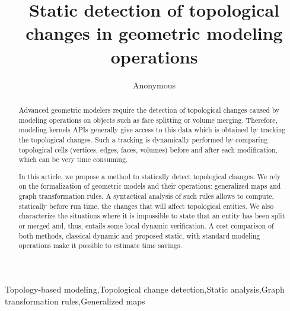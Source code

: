 \documentclass[times,twocolumn,final]{els-format/elsarticle}
\begin{document}

\begin{frontmatter}

\title{Static detection of topological changes in geometric modeling operations}%

\author{Anonymous}





\received{\today}

\begin{abstract}
  Advanced geometric modelers require the detection of topological changes
  caused by modeling operations on objects such as face splitting or volume
  merging. Therefore, modeling kernels APIs generally give access to this data
  which is obtained by tracking the topological changes. Such a tracking is
  dynamically performed by comparing topological cells (vertices, edges, faces,
  volumes) before and after each modification, which can be very time consuming.

  In this article, we propose a method to statically detect topological changes.
  We rely on the formalization of geometric models and their operations:
  generalized maps and graph transformation rules. A syntactical analysis of
  such rules allows to compute, statically before run time, the changes that
  will affect topological entities. We also characterize the situations where it
  is impossible to state that an entity has been split or merged and, thus,
  entails some local dynamic verification. A cost comparison of both
  methods, classical dynamic and proposed static, with standard modeling
  operations make it possible to estimate time savings.
\end{abstract}


\begin{keyword}
  \KWD Topology-based modeling\sep Topological change detection\sep Static analysis\sep Graph
  transformation rules\sep Generalized maps
\end{keyword}

\end{frontmatter}

\linenumbers









\end{document}
